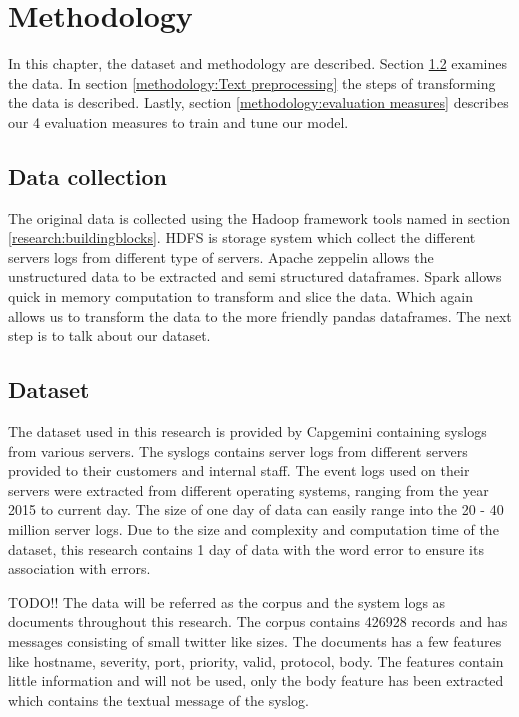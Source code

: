 \chapter{Methodology}  \label{ch:methodology}

In this chapter, the dataset and methodology are described. Section \ref{methodology:dataset} examines the data. In section \ref{methodology:Text preprocessing} the steps of transforming the data is described. Lastly, section \ref{methodology:evaluation measures} describes our 4 evaluation measures to train and tune our model.

\section{Data collection}
The original data is collected using the Hadoop framework tools named in section \ref{research:buildingblocks}. HDFS is storage system which collect the different servers logs from different type of servers. Apache zeppelin allows the unstructured data to be extracted and semi structured dataframes. Spark allows quick in memory computation to transform and slice the data. Which again allows us to transform the data to the more friendly pandas dataframes. The next step is to talk about our dataset.

\section{Dataset}\label{methodology:dataset}
The dataset used in this research is provided by Capgemini containing syslogs from various servers. The syslogs contains server logs from different servers provided to their customers and internal staff. The event logs used on their servers were extracted from different operating systems, ranging from the year 2015 to current day. The size of one day of data can easily range into the 20 - 40 million server logs. Due to the size and complexity and computation time of the dataset, this research contains 1 day of data with the word error to ensure its association with errors.

TODO!!
The data will be referred as the corpus and the system logs as documents throughout this research. The corpus contains 426928 records and has messages consisting of small twitter like sizes. The documents has a few features like hostname, severity, port, priority, valid, protocol, body. The features contain little information and will not be used, only the body feature has been extracted which contains the textual message of the syslog. 

